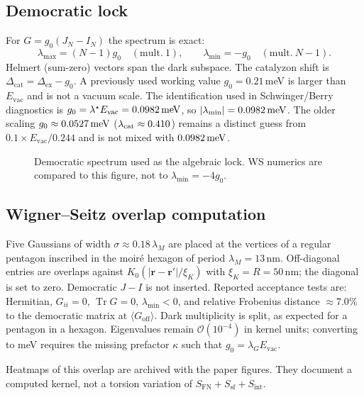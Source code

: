 \documentclass[11pt,letterpaper]{article}
\begin{document}
\subsection{Democratic lock}

For $G=g_0(J_N-I_N)$ the spectrum is exact:
\begin{equation}
\lambda_{\max}=(N-1)g_0\quad(\mathrm{mult.\ }1),\qquad
\lambda_{\min}=-g_0\quad(\mathrm{mult.\ }N-1).
\end{equation}
Helmert (sum-zero) vectors span the dark subspace. The catalyzon shift is $\Delta_{\mathrm{cat}}=\Delta_{\mathrm{ex}}-g_0$. A previously used working value $g_0=0.21$\,meV is larger than $E_{\mathrm{vac}}$ and is not a vacuum scale. The identification used in Schwinger/Berry diagnostics is $g_0=\lambda^\star E_{\mathrm{vac}}=0.0982\,\mathrm{meV}$, so $|\lambda_{\min}|=0.0982\,\mathrm{meV}$. The older scaling $g_0\approx0.0527\,\mathrm{meV}$ ($\lambda_{\mathrm{cat}}\approx0.410$) remains a distinct guess from $0.1\times E_{\mathrm{vac}}/0.244$ and is not mixed with $0.0982\,\mathrm{meV}$.

\begin{figure}[H]
\centering

\caption{Democratic spectrum used as the algebraic lock. WS numerics are compared to this figure, not to $\lambda_{\min}=-4g_0$.}
\label{fig:spec-s}
\end{figure}

\subsection{Wigner--Seitz overlap computation}

Five Gaussians of width $\sigma\approx 0.18\,\lambda_M$ are placed at the vertices of a regular pentagon inscribed in the moir\'e hexagon of period $\lambda_M=13$\,nm. Off-diagonal entries are overlaps against $K_0(|\mathbf{r}-\mathbf{r}'|/\xi_K)$ with $\xi_K=R=50$\,nm; the diagonal is set to zero. Democratic $J-I$ is not inserted. Reported acceptance tests are: Hermitian, $G_{ii}=0$, $\operatorname{Tr} G=0$, $\lambda_{\min}<0$, and relative Frobenius distance $\approx 7.0\%$ to the democratic matrix at $\langle G_{\mathrm{off}}\rangle$. Dark multiplicity is split, as expected for a pentagon in a hexagon. Eigenvalues remain $\mathcal{O}(10^{-4})$ in kernel units; converting to meV requires the missing prefactor $\kappa$ such that $g_0=\lambda_G E_{\mathrm{vac}}$.

Heatmaps of this overlap are archived with the paper figures. They document a computed kernel, not a torsion variation of $S_{\mathrm{FN}}+S_{\mathrm{sf}}+S_{\mathrm{int}}$.
\end{document}
